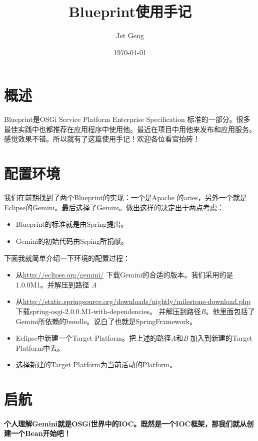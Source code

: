 \documentclass[a4paper,11pt,onecolumn,oneside]{article}
\title{Blueprint使用手记}
\author{Jet Geng}
\date{\today}
\begin{document}
\maketitle
\section{概述}
Blueprint是OSGi Service Platform Enterprise Specification 标准的一部分。很多最佳实践中也都推荐在应用程序中使用他。最近在项目中用他来发布和应用服务。感觉效果不错。所以就有了这篇使用手记！欢迎各位看官拍砖！
\section{配置环境}
我们在前期找到了两个Blueprint的实现：一个是Apache 的aries，另外一个就是Eclipse的Gemini。最后选择了Gemini。做出这样的决定出于两点考虑：
\begin{itemize}
    \item Blueprint的标准就是由Spring提出。
    \item Gemini的初始代码由Srping所捐献。
\end{itemize}
下面我就简单介绍一下环境的配置过程：
\begin{itemize}
    \item 从\url{http://eclipse.org/gemini/} 下载Gemini的合适的版本。我们采用的是1.0.0M1。并解压到路径 \emph{A}
    \item 从\url{http://static.springsource.org/downloads/nightly/milestone-download.php}下载spring-osgi-2.0.0.M1-with-dependencies。 并解压到路径\emph{B}。他里面包括了Gemini所依赖的bundle。说白了也就是SpringFramework。
    \item Eclipse中新建一个Target Platform。把上述的路径\emph{A}和\emph{B} 加入到新建的Target Platform中去。
    \item 选择新建的Target Platform为当前活动的Platform。
\end{itemize}
\section{启航}
\paragraph{个人理解Gemini就是OSGi世界中的IOC。既然是一个IOC框架，那我们就从创建一个Bean开始吧！}
\end{document}
